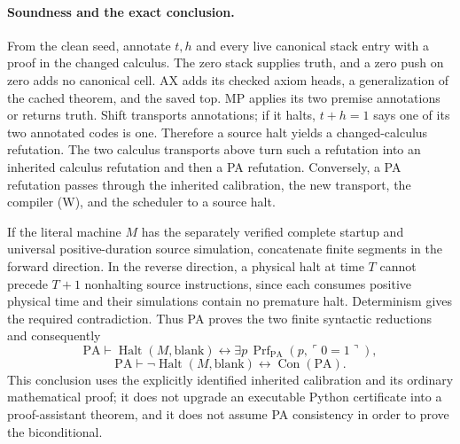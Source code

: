 \paragraph{Soundness and the exact conclusion.}
From the clean seed, annotate $t,h$ and every live canonical stack entry
with a proof in the changed calculus.  The zero stack supplies truth, and
a zero push on zero adds no canonical cell.  AX adds its checked axiom
heads, a generalization of the cached theorem, and the saved top.  MP
applies its two premise annotations or returns truth.  Shift transports
annotations; if it halts, $t+h=1$ says one of its two annotated codes is
one.  Therefore a source halt yields a changed-calculus refutation.
The two calculus transports above turn such a refutation into an inherited
calculus refutation and then a PA refutation.  Conversely, a PA refutation
passes through the inherited calibration, the new transport, the compiler
(W), and the scheduler to a source halt.

If the literal machine $M$ has the separately verified complete startup
and universal positive-duration source simulation, concatenate finite
segments in the forward direction.  In the reverse direction, a physical
halt at time $T$ cannot precede $T+1$ nonhalting source instructions, since
each consumes positive physical time and their simulations contain no
premature halt.  Determinism gives the required contradiction.  Thus PA
proves the two finite syntactic reductions and consequently
\[
 \mathrm{PA}\vdash
 \operatorname{Halt}(M,\mathrm{blank})
   \longleftrightarrow\exists p\,\operatorname{Prf}_{\mathrm{PA}}(p,\ulcorner0=1\urcorner),
\]
\[
 \mathrm{PA}\vdash
 \neg\operatorname{Halt}(M,\mathrm{blank})
   \longleftrightarrow\operatorname{Con}(\mathrm{PA}).
\]
This conclusion uses the explicitly identified inherited calibration and
its ordinary mathematical proof; it does not upgrade an executable Python
certificate into a proof-assistant theorem, and it does not assume PA
consistency in order to prove the biconditional.
